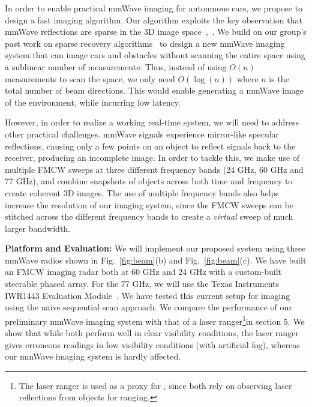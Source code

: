 

In order to enable practical mmWave imaging for autonmous cars, we propose to
design a fast imaging algorithm. Our algorithm exploits the key observation
that mmWave reflections are sparse in the 3D image
space~\cite{sparse_1},~\cite{sparse_2}.  We build on our group's past work on
sparse recovery algorithms~\cite{hassanieh2012simple,hassanieh2012nearly} to
design a new mmWave imaging system that can image cars and obstacles without
scanning the entire space using a sublinear number of measuremente. Thus, 
instead of using $O(n)$ measurements to scan the space, we only
need $O(\log(n))$ where $n$ is the total number of beam directions. 
This would enable generating a mmWave image of the environment, while incurring low latency.

However, in order to realize a working real-time system, we will need to
address other practical challenges. mmWave signals experience mirror-like
specular reflections, causing only a few points on an object to reflect signals
back to the receiver, producing an incomplete image. In order to tackle this,
we make use of multiple FMCW sweeps at three different frequency bands (24 GHz,
60 GHz and 77 GHz), and combine snapshots of objects across both time and
frequency to create coherent 3D images. The use of multiple frequency bands
also helps increase the resolution of our imaging system, since the FMCW sweeps
can be stitched across the different frequency bands to create a
\textit{virtual} sweep of much larger bandwidth. 



\noindent \textbf{Platform and Evaluation:} We will implement our proposed
system 
using three mmWave radios shown in Fig.~\ref{fig:beam}(b) and Fig.~\ref{fig:beam}(c). We have built
an FMCW imaging radar both at 60 GHz and 24 GHz with a custom-built steerable
phased array.  For the 77 GHz, we will use the Texas Instruments IWR1443
Evaluation Module~\cite{ti_board}.  We have tested this current setup for
imaging using the naive sequential scan approach.  We compare the performance
of our preliminary mmWave imaging system with that of a laser
ranger\footnote{The laser ranger is used as a proxy for \lidar, since both rely
on observing laser reflections from objects for ranging.}in section 5. We show
that while both perform well in clear visibility conditions, the laser ranger
gives erroneous readings in low visibility conditions (with artificial fog),
whereas our mmWave imaging system is hardly affected.


